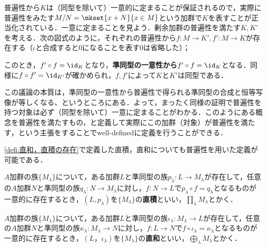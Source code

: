 普遍性から$K$は（同型を除いて）一意的に定まることが保証されるので，実際に普遍性をみたす$M/N=\mkset{x+N}{x\in M}$という加群で$K$を表すことが正当化されている．一意に定まることを見よう．剰余加群の普遍性を満たす$K,K'$を考える．次の図式のように，それぞれの普遍性から$f:M\to K',f':M\to K$が存在する（$\iota$と合成すると$0$になることを表す$0$は省略した）；
\begin{figure}[H]
	\centering
	\caption{}
\end{figure}

このとき，$f'\circ f=\id_K$となり，\textbf{準同型の一意性から}$f'\circ f=\id_K$となる．同様に$f\circ f'=\id_{K'}$が確かめられ，$f,f'$によって$K$と$K'$は同型である．

この議論の本質は，準同型の一意性から普遍性で得られる準同型の合成と恒等写像が等しくなる、というところにある．よって，まったく同様の証明で普遍性を持つ対象は必ず（同型を除いて）一意に定まることがわかる．このようにある概念を普遍性を満たすもの，と定義して実際にこの加群（対象）が普遍性を満たす，という主張をすることでwell-definedに定義を行うことができる．

\ref{defi:直和，直積の存在}で定義した直積，直和についても普遍性を用いた定義が可能である．

\begin{defi}[普遍性を用いた直積の定義]
	$A$加群の族$\{M_\lambda\}$について，ある加群$L$と準同型の族$p_\lambda:L\to M_\lambda$が存在して，任意の$A$加群$N$と準同型の族$q_\lambda:N\to M_\lambda$に対し，$f:N\to L$で$p_\lambda\circ f=q_\lambda$となるものが一意的に存在するとき，$(L,p_\lambda)$を$\{M_\lambda\}$の\textbf{直積}といい，$\prod_\lambda M_\lambda$とかく．
\end{defi}

\begin{defi}[普遍性を用いた直和の定義]
	$A$加群の族$\{M_\lambda\}$について，ある加群$L$と準同型の族$\iota_\lambda: M_\lambda\to L$が存在して，任意の$A$加群$N$と準同型の族$\kappa_\lambda: M_\lambda\to N$に対し，$f:L\to N$で$f\circ\iota_\lambda=\kappa_\lambda$となるものが一意的に存在するとき，$(L，\iota_\lambda)$を$\{M_\lambda\}$の\textbf{直和}といい，$\bigoplus_\lambda M_\lambda$とかく．
\end{defi}

